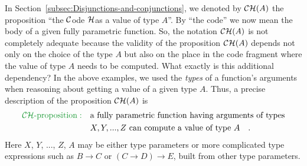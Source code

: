 In Section~\ref{subsec:Disjunctions-and-conjunctions}, we denoted
by ${\cal CH}(A)$ the proposition \textsf{``}the ${\cal C}$ode ${\cal H}$as
a value of type $A$\textsf{''}. By \textsf{``}the code\textsf{''} we now mean the body of
a given fully parametric function. So, the notation ${\cal CH}(A)$
is not completely adequate because the validity of the proposition
${\cal CH}(A)$ depends not only on the choice of the type $A$ but
also on the place in the code fragment where the value of type $A$
needs to be computed. What exactly is this additional dependency?
In the above examples, we used the \emph{types} of a function\textsf{'}s arguments
when reasoning about getting a value of a given type $A$. Thus, a
precise description of the proposition ${\cal CH}(A)$ is 
\begin{align}
{\color{greenunder}{\cal CH}\text{-proposition}:}\quad & \text{a fully parametric function having arguments of types}\nonumber \\
 & X,Y,...,Z\text{ can compute a value of type }A\quad.\label{eq:ch-CH-proposition-def}
\end{align}
Here $X$, $Y$, ..., $Z$, $A$ may be either type parameters or
more complicated type expressions such as $B\rightarrow C$ or $(C\rightarrow D)\rightarrow E$,
built from other type parameters.

